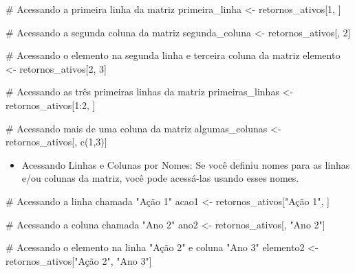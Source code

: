 \documentclass[
  portuguese,
  letterpaper,
  DIV=11,
  numbers=noendperiod]{scrreprt}
\newenvironment{Shaded}{\begin{snugshade}}{\end{snugshade}}
\newcommand{\CommentTok}[1]{\textcolor[rgb]{0.37,0.37,0.37}{#1}}
\newcommand{\DecValTok}[1]{\textcolor[rgb]{0.68,0.00,0.00}{#1}}
\newcommand{\FunctionTok}[1]{\textcolor[rgb]{0.28,0.35,0.67}{#1}}
\newcommand{\NormalTok}[1]{\textcolor[rgb]{0.00,0.23,0.31}{#1}}
\newcommand{\OtherTok}[1]{\textcolor[rgb]{0.00,0.23,0.31}{#1}}
\newcommand{\SpecialCharTok}[1]{\textcolor[rgb]{0.37,0.37,0.37}{#1}}
\newcommand{\StringTok}[1]{\textcolor[rgb]{0.13,0.47,0.30}{#1}}
\providecommand{\tightlist}{%
  \setlength{\itemsep}{0pt}\setlength{\parskip}{0pt}}
\theoremstyle{definition}
\theoremstyle{remark}
\begin{document}
\begin{Shaded}
\begin{Highlighting}[]
\CommentTok{\# Acessando a primeira linha da matriz}
\NormalTok{primeira\_linha }\OtherTok{\textless{}{-}}\NormalTok{ retornos\_ativos[}\DecValTok{1}\NormalTok{, ]}

\CommentTok{\# Acessando a segunda coluna da matriz}
\NormalTok{segunda\_coluna }\OtherTok{\textless{}{-}}\NormalTok{ retornos\_ativos[, }\DecValTok{2}\NormalTok{]}

\CommentTok{\# Acessando o elemento na segunda linha e terceira coluna da matriz}
\NormalTok{elemento }\OtherTok{\textless{}{-}}\NormalTok{ retornos\_ativos[}\DecValTok{2}\NormalTok{, }\DecValTok{3}\NormalTok{]}

\CommentTok{\# Acessando as três primeiras linhas da matriz}
\NormalTok{primeiras\_linhas }\OtherTok{\textless{}{-}}\NormalTok{ retornos\_ativos[}\DecValTok{1}\SpecialCharTok{:}\DecValTok{2}\NormalTok{, ]}

\CommentTok{\# Acessando mais de uma coluna da matriz}
\NormalTok{algumas\_colunas }\OtherTok{\textless{}{-}}\NormalTok{ retornos\_ativos[, }\FunctionTok{c}\NormalTok{(}\DecValTok{1}\NormalTok{,}\DecValTok{3}\NormalTok{)]}
\end{Highlighting}
\end{Shaded}

\begin{itemize}
\tightlist
\item
  Acessando Linhas e Colunas por Nomes: Se você definiu nomes para as
  linhas e/ou colunas da matriz, você pode acessá-las usando esses
  nomes.
\end{itemize}

\begin{Shaded}
\begin{Highlighting}[]
\CommentTok{\# Acessando a linha chamada "Ação 1"}
\NormalTok{acao1 }\OtherTok{\textless{}{-}}\NormalTok{ retornos\_ativos[}\StringTok{"Ação 1"}\NormalTok{, ]}

\CommentTok{\# Acessando a coluna chamada "Ano 2"}
\NormalTok{ano2 }\OtherTok{\textless{}{-}}\NormalTok{ retornos\_ativos[, }\StringTok{"Ano 2"}\NormalTok{]}

\CommentTok{\# Acessando o elemento na linha "Ação 2" e coluna "Ano 3"}
\NormalTok{elemento2 }\OtherTok{\textless{}{-}}\NormalTok{ retornos\_ativos[}\StringTok{"Ação 2"}\NormalTok{, }\StringTok{"Ano 3"}\NormalTok{]}
\end{Highlighting}
\end{Shaded}
\end{document}

